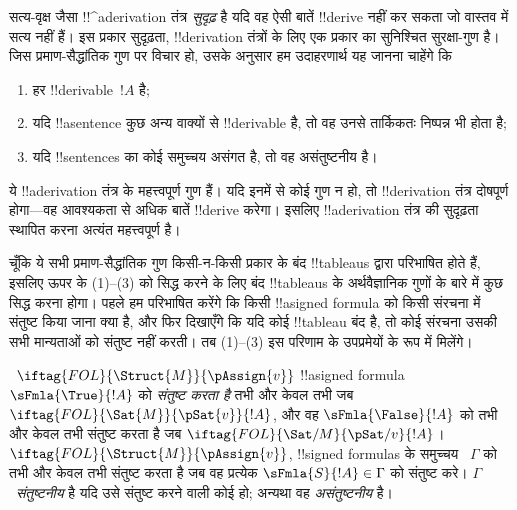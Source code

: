 \documentclass[../../../include/open-logic-section]{subfiles}
\begin{document}
      {}
      {}
      

\begin{explain}
सत्य-वृक्ष जैसा !!^a{derivation} तंत्र \emph{सुदृढ़} है यदि वह ऐसी बातें
!!{derive} नहीं कर सकता जो वास्तव में सत्य नहीं हैं। इस प्रकार सुदृढ़ता,
!!{derivation} तंत्रों के लिए एक प्रकार का सुनिश्चित सुरक्षा-गुण है। जिस
प्रमाण-सैद्धांतिक गुण पर विचार हो, उसके अनुसार हम उदाहरणार्थ यह जानना चाहेंगे
कि
\begin{enumerate}
\item हर !!{derivable}~$!A$  है;
\item यदि !!a{sentence} कुछ अन्य वाक्यों से !!{derivable} है, तो वह उनसे
  तार्किकतः निष्पन्न भी होता है;
\item यदि !!{sentence}s का कोई समुच्चय असंगत है, तो वह असंतुष्टनीय है।
\end{enumerate}
ये !!a{derivation} तंत्र के महत्त्वपूर्ण गुण हैं। यदि इनमें से कोई गुण न हो,
तो !!{derivation} तंत्र दोषपूर्ण होगा---वह आवश्यकता से अधिक बातें !!{derive}
करेगा। इसलिए !!a{derivation} तंत्र की सुदृढ़ता स्थापित करना अत्यंत
महत्त्वपूर्ण है।

चूँकि ये सभी प्रमाण-सैद्धांतिक गुण किसी-न-किसी प्रकार के बंद !!{tableau}s
द्वारा परिभाषित होते हैं, इसलिए ऊपर के (1)--(3) को सिद्ध करने के लिए बंद
!!{tableau}s के अर्थवैज्ञानिक गुणों के बारे में कुछ सिद्ध करना होगा। पहले हम
परिभाषित करेंगे कि किसी !!a{signed
  formula} को किसी संरचना में संतुष्ट किया
जाना क्या है, और फिर दिखाएँगे कि यदि कोई !!{tableau} बंद है, तो कोई संरचना
उसकी सभी मान्यताओं को संतुष्ट नहीं करती। तब (1)--(3) इस परिणाम के उपप्रमेयों
के रूप में मिलेंगे।
\end{explain}

\begin{defn}
~$\iftag{FOL}{\Struct{M}}{\pAssign{v}}$
!!a{signed formula} $\sFmla{\True}{!A}$ को \emph{संतुष्ट करता है} तभी और
केवल तभी जब $\iftag{FOL}{\Sat{M}}{\pSat{v}}{!A}$, और वह
$\sFmla{\False}{!A}$ को तभी और केवल तभी संतुष्ट करता है जब
$\iftag{FOL}{\Sat/{M}}{\pSat/{v}}{!A}$।
$\iftag{FOL}{\Struct{M}}{\pAssign{v}}$, !!{signed formula}s के समुच्चय
~$\Gamma$ को तभी और केवल तभी संतुष्ट करता है जब वह प्रत्येक
$\sFmla{S}{!A} \in \Gamma$ को संतुष्ट करे। $\Gamma$~\emph{संतुष्टनीय} है
यदि उसे संतुष्ट करने वाली कोई 
हो; अन्यथा वह \emph{असंतुष्टनीय} है।
\end{defn}
\end{document}
